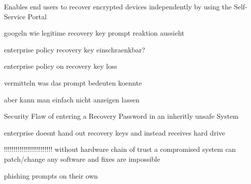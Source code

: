 Enables end users to recover encrypted devices independently by using the Self-Service Portal

googeln wie legitime recovery key prompt reaktion aussieht

enterprise policy recovery key einschraenkbar?

enterprise policy on recovery key loss

vermitteln was das prompt bedeuten koennte

aber kann man einfach nicht anzeigen lassen

Security Flaw of entering a Recovery Password in an inheritly unsafe System

enterprise doesnt hand out recovery keys and instead receives hard drive


!!!!!!!!!!!!!!!!!!!!!!!!!
without hardware chain of trust a compromised system can patch/change any software and fixes are impossible

phishing prompts on their own